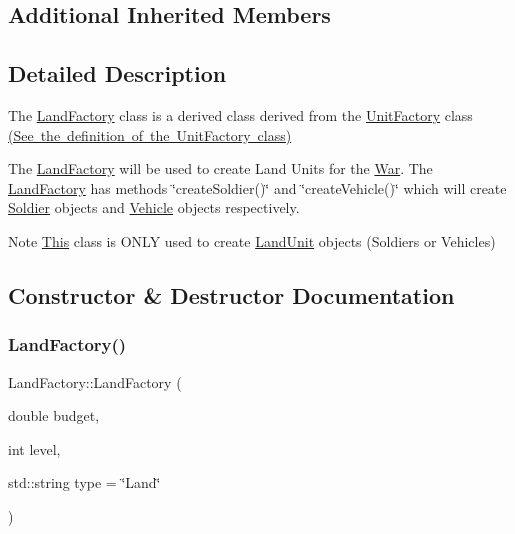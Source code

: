 \subsection*{Additional Inherited Members}


\subsection{Detailed Description}
The \mbox{\hyperlink{class_land_factory}{Land\+Factory}} class is a derived class derived from the \mbox{\hyperlink{class_unit_factory}{Unit\+Factory}} class \mbox{\hyperlink{_unit_factory_8h_source}{(See the definition of the Unit\+Factory class)}}

The \mbox{\hyperlink{class_land_factory}{Land\+Factory}} will be used to create Land Units for the \mbox{\hyperlink{class_war}{War}}. The \mbox{\hyperlink{class_land_factory}{Land\+Factory}} has methods \char`\"{}create\+Soldier()\char`\"{} and \char`\"{}create\+Vehicle()\char`\"{} which will create \mbox{\hyperlink{class_soldier}{Soldier}} objects and \mbox{\hyperlink{class_vehicle}{Vehicle}} objects respectively. \begin{DoxyNote}{Note}
\mbox{\hyperlink{class_this}{This}} class is O\+N\+LY used to create \mbox{\hyperlink{class_land_unit}{Land\+Unit}} objects (Soldiers or Vehicles) 
\end{DoxyNote}


\subsection{Constructor \& Destructor Documentation}
\mbox{\label{class_land_factory_a6863eabc4fe2248aff95aa82b8ce0e16}} 
\subsubsection{\texorpdfstring{LandFactory()}{LandFactory()}}
{\footnotesize\ttfamily Land\+Factory\+::\+Land\+Factory (\begin{DoxyParamCaption}\item[{double}]{budget,  }\item[{int}]{level,  }\item[{std\+::string}]{type = {\ttfamily \char`\"{}Land\char`\"{}} }\end{DoxyParamCaption})}



